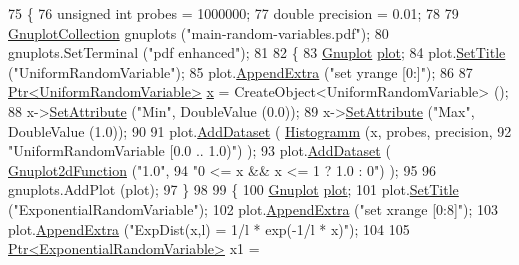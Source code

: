 \begin{DoxyCode}
75 \{
76   \textcolor{keywordtype}{unsigned} \textcolor{keywordtype}{int} probes = 1000000;
77   \textcolor{keywordtype}{double} precision = 0.01;
78 
79   \hyperlink{classns3_1_1GnuplotCollection}{GnuplotCollection} gnuplots (\textcolor{stringliteral}{"main-random-variables.pdf"});
80   gnuplots.SetTerminal (\textcolor{stringliteral}{"pdf enhanced"});
81 
82   \{
83     \hyperlink{classns3_1_1Gnuplot}{Gnuplot} \hyperlink{lte__amc_8m_a5942306abe9f005572e4344e3cdef528}{plot};
84     plot.\hyperlink{classns3_1_1Gnuplot_ac01f15633d49f0239f8a45293a1e04f0}{SetTitle} (\textcolor{stringliteral}{"UniformRandomVariable"});
85     plot.\hyperlink{classns3_1_1Gnuplot_a649a3041b9d0ea21a212b5ad9b28ecbf}{AppendExtra} (\textcolor{stringliteral}{"set yrange [0:]"});
86 
87     \hyperlink{classns3_1_1Ptr}{Ptr<UniformRandomVariable>} \hyperlink{lte__link__budget__x2__handover__measures_8m_a9336ebf25087d91c818ee6e9ec29f8c1}{x} = CreateObject<UniformRandomVariable> ();
88     x->\hyperlink{classns3_1_1ObjectBase_ac60245d3ea4123bbc9b1d391f1f6592f}{SetAttribute} (\textcolor{stringliteral}{"Min"}, DoubleValue (0.0));
89     x->\hyperlink{classns3_1_1ObjectBase_ac60245d3ea4123bbc9b1d391f1f6592f}{SetAttribute} (\textcolor{stringliteral}{"Max"}, DoubleValue (1.0));
90 
91     plot.\hyperlink{classns3_1_1Gnuplot_a306ec724a327cf9ab699700f31fca0a1}{AddDataset} ( \hyperlink{main-random-variable_8cc_a2cfd3837ab3f2e816cf53486d7a186b5}{Histogramm} (x, probes, precision,
92                                   \textcolor{stringliteral}{"UniformRandomVariable [0.0 .. 1.0)"}) );
93     plot.\hyperlink{classns3_1_1Gnuplot_a306ec724a327cf9ab699700f31fca0a1}{AddDataset} ( \hyperlink{classns3_1_1Gnuplot2dFunction}{Gnuplot2dFunction} (\textcolor{stringliteral}{"1.0"},
94                                          \textcolor{stringliteral}{"0 <= x && x <= 1 ? 1.0 : 0"}) );
95 
96     gnuplots.AddPlot (plot);
97   \}
98 
99   \{
100     \hyperlink{classns3_1_1Gnuplot}{Gnuplot} \hyperlink{lte__amc_8m_a5942306abe9f005572e4344e3cdef528}{plot};
101     plot.\hyperlink{classns3_1_1Gnuplot_ac01f15633d49f0239f8a45293a1e04f0}{SetTitle} (\textcolor{stringliteral}{"ExponentialRandomVariable"});
102     plot.\hyperlink{classns3_1_1Gnuplot_a649a3041b9d0ea21a212b5ad9b28ecbf}{AppendExtra} (\textcolor{stringliteral}{"set xrange [0:8]"});
103     plot.\hyperlink{classns3_1_1Gnuplot_a649a3041b9d0ea21a212b5ad9b28ecbf}{AppendExtra} (\textcolor{stringliteral}{"ExpDist(x,l) = 1/l * exp(-1/l * x)"});
104 
105     \hyperlink{classns3_1_1Ptr}{Ptr<ExponentialRandomVariable>} x1 = 

\end{DoxyCode}
